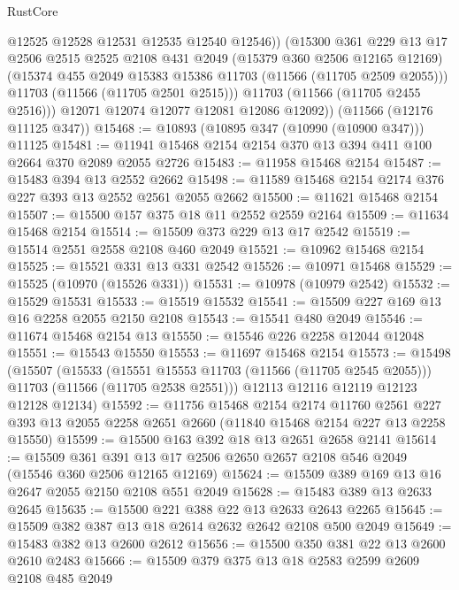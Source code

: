 \begin{lexlean}{RustCore}
\begin{coremodule}
              @12525
              @12528
              @12531
              @12535
              @12540
              @12546))
          (@15300
            @361
            @229
            @13
            @17
            @2506
            @2515
            @2525
            @2108
            @431
            @2049
            (@15379 @360 @2506 @12165 @12169)
            (@15374 @455 @2049 @15383 @15386 @11703 (@11566 (@11705 @2509 @2055)))
            @11703
            (@11566 (@11705 @2501 @2515)))
          @11703
          (@11566 (@11705 @2455 @2516)))
        @12071
        @12074
        @12077
        @12081
        @12086
        @12092))
    (@11566 (@12176 @11125 @347))
@15468 := @10893 (@10895 @347 (@10990 (@10900 @347))) @11125
@15481 := @11941 @15468 @2154 @2154 @370 @13 @394 @411 @100 @2664 @370 @2089 @2055 @2726
@15483 := @11958 @15468 @2154
@15487 := @15483 @394 @13 @2552 @2662
@15498 := @11589 @15468 @2154 @2174 @376 @227 @393 @13 @2552 @2561 @2055 @2662
@15500 := @11621 @15468 @2154
@15507 := @15500 @157 @375 @18 @11 @2552 @2559 @2164
@15509 := @11634 @15468 @2154
@15514 := @15509 @373 @229 @13 @17 @2542
@15519 := @15514 @2551 @2558 @2108 @460 @2049
@15521 := @10962 @15468 @2154
@15525 := @15521 @331 @13 @331 @2542
@15526 := @10971 @15468
@15529 := @15525 (@10970 (@15526 @331))
@15531 := @10978 (@10979 @2542)
@15532 := @15529 @15531
@15533 := @15519 @15532
@15541 := @15509 @227 @169 @13 @16 @2258 @2055 @2150 @2108
@15543 := @15541 @480 @2049
@15546 := @11674 @15468 @2154 @13
@15550 := @15546 @226 @2258 @12044 @12048
@15551 := @15543 @15550
@15553 := @11697 @15468 @2154
@15573 := @15498
    (@15507
      (@15533
        (@15551 @15553 @11703 (@11566 (@11705 @2545 @2055)))
        @11703
        (@11566 (@11705 @2538 @2551)))
      @12113
      @12116
      @12119
      @12123
      @12128
      @12134)
@15592 := @11756
    @15468
    @2154
    @2174
    @11760
    @2561
    @227
    @393
    @13
    @2055
    @2258
    @2651
    @2660
    (@11840 @15468 @2154 @227 @13 @2258 @15550)
@15599 := @15500 @163 @392 @18 @13 @2651 @2658 @2141
@15614 := @15509
    @361
    @391
    @13
    @17
    @2506
    @2650
    @2657
    @2108
    @546
    @2049
    (@15546 @360 @2506 @12165 @12169)
@15624 := @15509 @389 @169 @13 @16 @2647 @2055 @2150 @2108 @551 @2049
@15628 := @15483 @389 @13 @2633 @2645
@15635 := @15500 @221 @388 @22 @13 @2633 @2643 @2265
@15645 := @15509 @382 @387 @13 @18 @2614 @2632 @2642 @2108 @500 @2049
@15649 := @15483 @382 @13 @2600 @2612
@15656 := @15500 @350 @381 @22 @13 @2600 @2610 @2483
@15666 := @15509 @379 @375 @13 @18 @2583 @2599 @2609 @2108 @485 @2049

\end{coremodule}
\end{lexlean}
